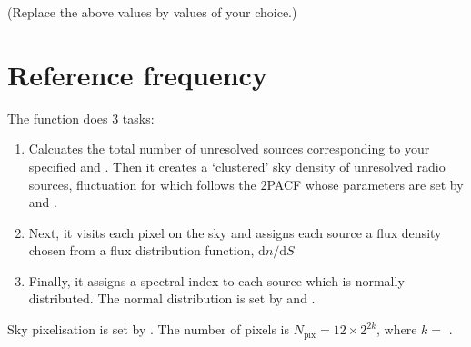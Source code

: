\documentclass[letterpaper,10pt,english]{sphinxmanual}
\begin{document}
\sphinxAtStartPar
(Replace the above values by values of your choice.)


\section{Reference frequency}
\label{\detokenize{detexp:reference-frequency}}\label{\detokenize{detexp:ref-freq}}
\sphinxAtStartPar
The function  does 3 tasks:\sphinxhyphen{}
\begin{enumerate}
%
\item {} 
\sphinxAtStartPar
Calcuates the total number of unresolved sources corresponding to your specified  and . Then it creates a ‘clustered’ sky density of unresolved radio sources, fluctuation for which follows the 2PACF whose parameters are set by  and .

\item {} 
\sphinxAtStartPar
Next, it visits each pixel on the sky and assigns each source a flux density chosen from a flux distribution function, \(\mathrm{d}n/\mathrm{d}S\)

\item {} 
\sphinxAtStartPar
Finally, it assigns a spectral index to each source which is normally distributed. The normal distribution is set by  and .

\end{enumerate}

\sphinxAtStartPar
Sky pixelisation is set by . The number of pixels is \(N_{\mathrm{pix}} = 12\times 2^{2k}\), where \(k=\) .
\end{document}
